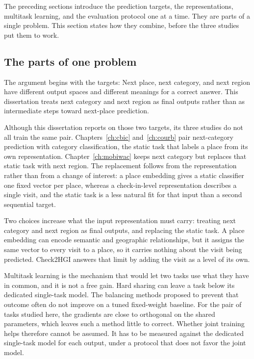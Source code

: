 The preceding sections introduce the prediction targets, the representations, multitask
learning, and the evaluation protocol one at a time. They are parts of a
single problem. This section states how they combine, before the three studies put
them to work.

\subsection{The parts of one problem}
The argument begins with the targets: Next place, next category, and next region have
different output spaces and different meanings for a correct answer. This dissertation
treats next category and next region as final outputs rather than as intermediate
steps toward next-place prediction.

Although this dissertation reports on those two targets, its three studies do not all
train the same pair. Chapters~\ref{ch:cbic}
and~\ref{ch:courb} pair next-category prediction with category classification, the
static task that labels a place from its own representation.
Chapter~\ref{ch:mobiwac} keeps next category but replaces that static task with next
region. The replacement follows from the representation rather than from a change of
interest: a place embedding gives a static classifier one fixed vector per place,
whereas a check-in-level representation describes a single visit, and the static task
is a less natural fit for that input than a second sequential target.

Two choices increase what the input representation must carry: treating next category
and next region as final outputs, and replacing the static task. A place embedding
can encode semantic and geographic relationships, but it assigns the same vector to
every visit to a place, so it carries nothing about the visit being predicted.
Check2HGI answers that limit by adding the visit as a level of its own.

Multitask learning is the mechanism that would let two tasks use what they have in
common, and it is not a free gain. Hard sharing can leave a task below its dedicated
single-task model. The balancing methods proposed to prevent that outcome often do not
improve on a tuned fixed-weight baseline. For the pair of tasks studied here, the
gradients are close to orthogonal on the shared parameters, which leaves such a method
little to correct. Whether joint training helps therefore cannot be assumed. It has to be
measured against the dedicated single-task model for each output, under a protocol
that does not favor the joint model.

